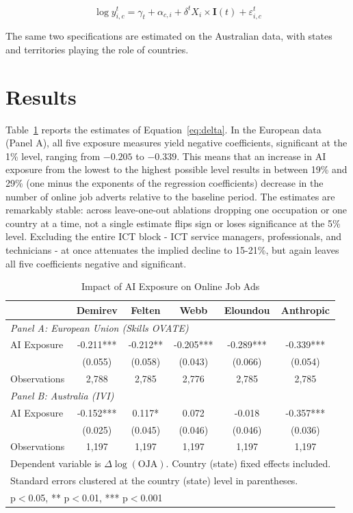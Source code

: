 \documentclass[11pt]{article}
\begin{document}
\begin{equation}
\log{y^t_{i,c}}=\gamma_t + \alpha_{c,i} + \delta^{t} X_{i} \times \mathbf{I}(t) + \varepsilon^t_{i,c}
\label{eq:event}
\end{equation}

The same two specifications are estimated on the Australian data, with states and territories playing the role of countries.

\section{Results}

Table~\ref{table:delta} reports the estimates of Equation~\ref{eq:delta}. In the European data (Panel A), all five exposure measures yield negative coefficients, significant at the 1\% level, ranging from $-0.205$ to $-0.339$. This means that an increase in AI exposure from the lowest to the highest possible level results in between 19\% and 29\% (one minus the exponents of the regression coefficients) decrease in the number of online job adverts relative to the baseline period. The estimates are remarkably stable: across leave-one-out ablations dropping one occupation or one country at a time, not a single estimate flips sign or loses significance at the 5\% level. Excluding the entire ICT block - ICT service managers, professionals, and technicians - at once attenuates the implied decline to 15-21\%, but again leaves all five coefficients negative and significant.

\begin{table}[H]
\centering
\caption{Impact of AI Exposure on Online Job Ads}
\begin{tabular}{lccccc}
\hline\hline
 & Demirev & Felten & Webb & Eloundou & Anthropic \\
\midrule
\multicolumn{6}{l}{\textit{Panel A: European Union (Skills OVATE)}} \\
\midrule
AI Exposure & -0.211*** & -0.212** & -0.205*** & -0.289*** & -0.339*** \\
 & (0.055) & (0.058) & (0.043) & (0.066) & (0.054) \\
Observations & 2,788 & 2,785 & 2,776 & 2,785 & 2,785 \\
\midrule
\multicolumn{6}{l}{\textit{Panel B: Australia (IVI)}} \\
\midrule
AI Exposure & -0.152*** & 0.117* & 0.072 & -0.018 & -0.357*** \\
 & (0.025) & (0.045) & (0.046) & (0.046) & (0.036) \\
Observations & 1,197 & 1,197 & 1,197 & 1,197 & 1,197 \\
\hline\hline
\multicolumn{6}{l}{\footnotesize Dependent variable is $\Delta \log(\text{OJA})$. Country (state) fixed effects included.} \\
\multicolumn{6}{l}{\footnotesize Standard errors clustered at the country (state) level in parentheses.} \\
\multicolumn{6}{l}{\footnotesize * p$<$0.05, ** p$<$0.01, *** p$<$0.001} \\
\end{tabular}
\label{table:delta}
\end{table}
\end{document}
